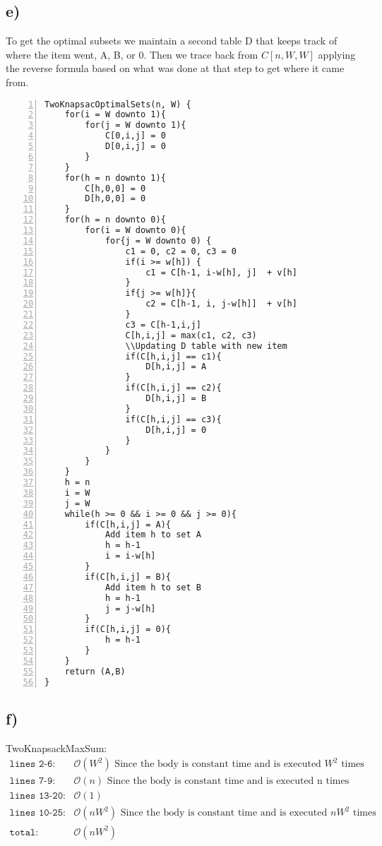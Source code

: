 \documentclass[12pt]{article}
\begin{document}
\subsection*{e)}
To get the optimal subsets we maintain a second table D that keeps track of where the item went, A, B, or 0. Then we trace back from $C[n,W,W]$ applying the reverse formula based on what was done at that step to get where it came from.
\begin{Verbatim}[numbers=left]
TwoKnapsacOptimalSets(n, W) {
    for(i = W downto 1){
        for(j = W downto 1){
            C[0,i,j] = 0
            D[0,i,j] = 0
        }
    }
    for(h = n downto 1){
        C[h,0,0] = 0
        D[h,0,0] = 0
    }
    for(h = n downto 0){
        for(i = W downto 0){
            for{j = W downto 0) {
                c1 = 0, c2 = 0, c3 = 0
                if(i >= w[h]) {
                    c1 = C[h-1, i-w[h], j]  + v[h]
                }
                if{j >= w[h]}{
                    c2 = C[h-1, i, j-w[h]]  + v[h]
                }
                c3 = C[h-1,i,j]
                C[h,i,j] = max(c1, c2, c3)
                \\Updating D table with new item
                if(C[h,i,j] == c1){
                    D[h,i,j] = A
                }
                if(C[h,i,j] == c2){
                    D[h,i,j] = B
                }
                if(C[h,i,j] == c3){
                    D[h,i,j] = 0
                }
            }
        }
    }
    h = n
    i = W
    j = W
    while(h >= 0 && i >= 0 && j >= 0){
        if(C[h,i,j] = A){
            Add item h to set A
            h = h-1
            i = i-w[h]
        }
        if(C[h,i,j] = B){
            Add item h to set B
            h = h-1
            j = j-w[h]
        }
        if(C[h,i,j] = 0){
            h = h-1
        }
    }
    return (A,B)
}
\end{Verbatim}

\subsection*{f)}
TwoKnapsackMaxSum:\\
\begin{align*}
    \texttt{lines 2-6: } & \mathcal{O}(W^2) \text{ Since the body is constant time and is executed $W^2$ times}\\
    \texttt{lines 7-9: } & \mathcal{O}(n) \text{ Since the body is constant time and is executed n times}\\
    \texttt{lines 13-20: } & \mathcal{O}(1)\\
    \texttt{lines 10-25: } & \mathcal{O}(nW^2) \text{ Since the body is constant time and is executed $nW^2$ times}\\
    \texttt{total: } & \mathcal{O}(nW^2)
\end{align*}
\end{document}
